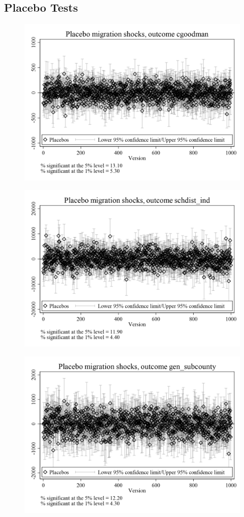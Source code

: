\documentclass{article}
\begin{document}
\subsection{Placebo Tests}
\clearpage
\begin{figure}
	\centering
	\includegraphics[width=.8\textwidth]{figures/exogeneity_tests/D17_placebo_cgoodman_urban.png}
\end{figure}
\clearpage
\begin{figure}
	\centering
	\includegraphics[width=.8\textwidth]{figures/exogeneity_tests/D17_placebo_schdist_ind_urban.png}
\end{figure}
\clearpage
\begin{figure}
	\centering
	\includegraphics[width=.8\textwidth]{figures/exogeneity_tests/D17_placebo_gen_subcounty_urban.png}
\end{figure}
\end{document}
